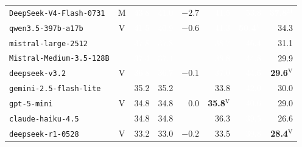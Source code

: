 \begin{table}[htbp]
{\begin{tabular}{lcrrr@{\hspace{2em}}rrr}
\texttt{DeepSeek-V4-Flash-0731} & $\mathrm{M}$ & \cellcolor[HTML]{23489D}\textcolor{white}{43.8} & \cellcolor[HTML]{2259A6}\textcolor{white}{41.0} & $-2.7$ & \cellcolor[HTML]{2256A4}\textcolor{white}{41.5} & \cellcolor[HTML]{081D58}\textcolor{white}{53.8} & \cellcolor[HTML]{2071B1}\textcolor{white}{\textbf{37.8}$^{\mathrm{M}}$} \\
\texttt{qwen3.5-397b-a17b} & $\mathrm{V}$ & \cellcolor[HTML]{2256A4}\textcolor{white}{41.5} & \cellcolor[HTML]{225AA6}\textcolor{white}{40.9} & $-0.6$ & \cellcolor[HTML]{2257A5}\textcolor{white}{41.3} & \cellcolor[HTML]{162876}\textcolor{white}{\textbf{50.4}$^{\mathrm{V}}$} & \cellcolor[HTML]{1E8BBE}34.3 \\
\texttt{mistral-large-2512} &  & \cellcolor[HTML]{2070B1}\textcolor{white}{37.8} & \cellcolor[HTML]{2070B1}\textcolor{white}{37.8} &  & \cellcolor[HTML]{216AAE}\textcolor{white}{38.7} & \cellcolor[HTML]{243794}\textcolor{white}{46.4} & \cellcolor[HTML]{2A9EC2}31.1 \\
\texttt{Mistral-Medium-3.5-128B} &  & \cellcolor[HTML]{2073B3}\textcolor{white}{37.4} & \cellcolor[HTML]{2073B3}\textcolor{white}{37.4} &  & \cellcolor[HTML]{2169AE}\textcolor{white}{38.8} & \cellcolor[HTML]{234199}\textcolor{white}{44.8} & \cellcolor[HTML]{31A5C2}29.9 \\
\texttt{deepseek-v3.2} & $\mathrm{V}$ & \cellcolor[HTML]{1F78B5}\textcolor{white}{36.8} & \cellcolor[HTML]{1F79B5}\textcolor{white}{36.7} & $-0.1$ & \cellcolor[HTML]{2076B4}\textcolor{white}{37.0} & \cellcolor[HTML]{23439A}\textcolor{white}{44.6} & \cellcolor[HTML]{32A6C2}\textbf{29.6}$^{\mathrm{V}}$ \\
\texttt{gemini-2.5-flash-lite} &  & \cellcolor[HTML]{1E84BA}35.2 & \cellcolor[HTML]{1E84BA}35.2 &  & \cellcolor[HTML]{1D8FBF}33.8 & \cellcolor[HTML]{2253A3}\textcolor{white}{42.0} & \cellcolor[HTML]{30A4C2}30.0 \\
\texttt{gpt-5-mini} & $\mathrm{V}$ & \cellcolor[HTML]{1E87BC}34.8 & \cellcolor[HTML]{1E87BC}34.8 & $0.0$ & \cellcolor[HTML]{1F80B8}\textbf{35.8}$^{\mathrm{V}}$ & \cellcolor[HTML]{225BA7}\textcolor{white}{40.6} & \cellcolor[HTML]{35A9C3}29.0 \\
\texttt{claude-haiku-4.5} &  & \cellcolor[HTML]{1E87BC}34.8 & \cellcolor[HTML]{1E87BC}34.8 &  & \cellcolor[HTML]{1F7CB7}36.3 & \cellcolor[HTML]{2164AB}\textcolor{white}{39.5} & \cellcolor[HTML]{43B6C4}26.6 \\
\texttt{deepseek-r1-0528} & $\mathrm{V}$ & \cellcolor[HTML]{1F92C0}33.2 & \cellcolor[HTML]{2194C0}33.0 & $-0.2$ & \cellcolor[HTML]{1E91C0}33.5 & \cellcolor[HTML]{2262AA}\textcolor{white}{39.8} & \cellcolor[HTML]{38ADC3}\textbf{28.4}$^{\mathrm{V}}$ \\

\end{tabular}}
\end{table}
